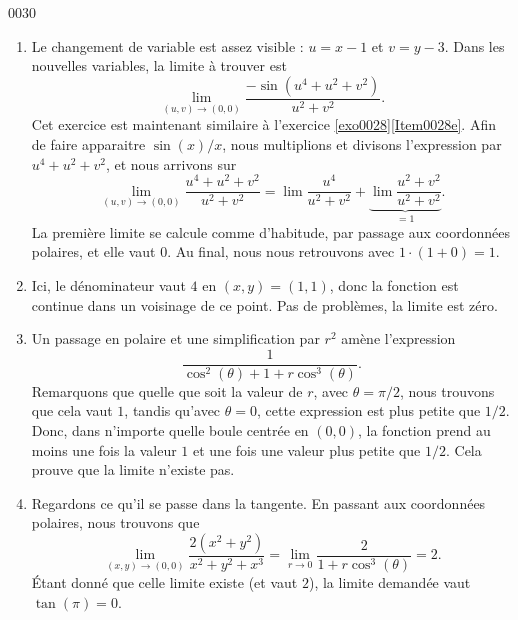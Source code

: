 
\begin{corrige}{0030}

\begin{enumerate}
\item
Le changement de variable est assez visible : $u=x-1$ et $v=y-3$. Dans les nouvelles variables, la limite à trouver est
\begin{equation}
	\lim_{(u,v)\to(0,0)}\frac{ -\sin(u^4+u^2+v^2) }{ u^2+v^2 }.
\end{equation}
Cet exercice est maintenant similaire à l'exercice \ref{exo0028}\ref{Item0028e}. Afin de faire apparaitre $\sin(x)/x$, nous multiplions et divisons l'expression par $u^4+u^2+v^2$, et nous arrivons sur
\begin{equation}
	\lim_{(u,v)\to(0,0)}\frac{ u^4+u^2+v^2 }{ u^2+v^2 }=\lim\frac{ u^4 }{ u^2+v^2 }+\underbrace{\lim\frac{ u^2+v^2 }{ u^2+v^2 }}_{=1}.
\end{equation}
La première limite se calcule comme d'habitude, par passage aux coordonnées polaires, et elle vaut $0$. Au final, nous nous retrouvons avec $1\cdot(1+0)=1$.

\item
Ici, le dénominateur vaut $4$ en $(x,y)=(1,1)$, donc la fonction est continue dans un voisinage de ce point. Pas de problèmes, la limite est zéro.

\item
Un passage en polaire et une simplification par $r^2$ amène l'expression
\begin{equation}
	\frac{1}{ \cos^2(\theta)+1+r\cos^3(\theta) }.
\end{equation}
Remarquons que quelle que soit la valeur de $r$, avec $\theta=\pi/2$, nous trouvons que cela vaut $1$, tandis qu'avec $\theta=0$, cette expression est plus petite que $1/2$. Donc, dans n'importe quelle boule centrée en $(0,0)$, la fonction prend au moins une fois la valeur $1$ et une fois une valeur plus petite que $1/2$. Cela prouve que la limite n'existe pas.

\item
Regardons ce qu'il se passe dans la tangente. En passant aux coordonnées polaires, nous trouvons que
\begin{equation}
	\lim_{(x,y)\to(0,0)}\frac{ 2(x^2+y^2) }{ x^2+y^2+x^3 }=\lim_{r\to 0}\frac{ 2 }{ 1+r\cos^3(\theta) }=2.
\end{equation}
Étant donné que celle limite existe (et vaut $2$), la limite demandée vaut $\tan(\pi)=0$.

\end{enumerate}

\end{corrige}
